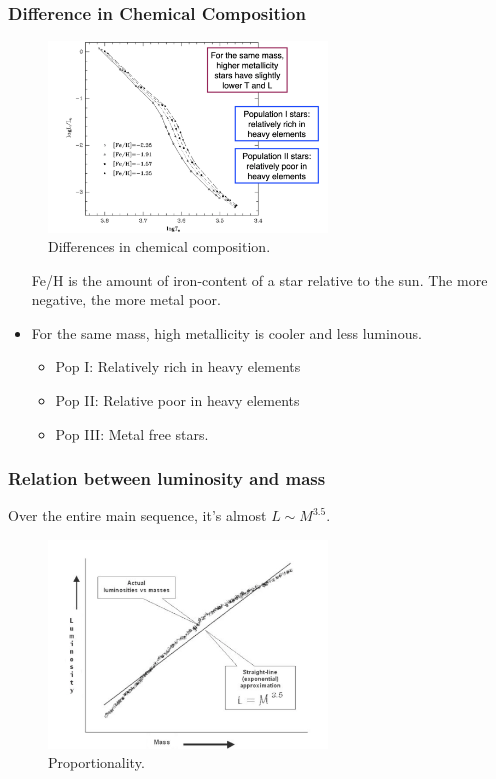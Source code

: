 \documentclass{article}
\begin{document}
\subsubsection{Difference in Chemical Composition}
\begin{figure}
    \centering
    \includegraphics[width=0.66\textwidth]{figs/Screen Shot 2021-09-15 at 9.04.48 AM.png}
    \caption{Differences in chemical composition.}
    \label{fig:zcomp}
\end{figure}

\begin{itemize}
    \item [Fe/H] is the amount of iron-content of a star relative to the sun. The more negative, the more metal poor. 
    \item For the same mass, high metallicity is cooler and less luminous. 
    \begin{itemize}
        \item Pop I: Relatively rich in heavy elements
        \item Pop II: Relative poor in heavy elements
        \item Pop III: Metal free stars. 
    \end{itemize}
\end{itemize}

\subsubsection{Relation between luminosity and mass}

Over the entire main sequence, it's almost $L\sim M^{3.5}$. 

\begin{figure}
    \centering
    \includegraphics[width=0.66\textwidth]{figs/Screen Shot 2021-09-15 at 9.04.57 AM.png}
    \caption{Proportionality. }
    \label{fig:prop_approx}
\end{figure}
\end{document}
